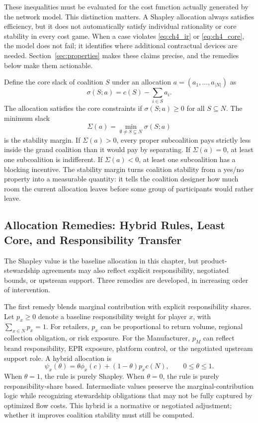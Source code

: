 These inequalities must be evaluated for the cost function actually generated by the network model. This distinction matters. A Shapley allocation always satisfies efficiency, but it does not automatically satisfy individual rationality or core stability in every cost game. When a case violates \eqref{eq:ch4_ir} or \eqref{eq:ch4_core}, the model does not fail; it identifies where additional contractual devices are needed. Section~\ref{sec:properties} makes these claims precise, and the remedies below make them actionable.

Define the core slack of coalition $S$ under an allocation $a=(a_1,\ldots,a_{|N|})$ as
\begin{equation}
\label{eq:ch4_core_slack}
\sigma(S;a)=c(S)-\sum_{i\in S}a_i.
\end{equation}
The allocation satisfies the core constraints if $\sigma(S;a)\geq 0$ for all $S\subseteq N$. The minimum slack
\begin{equation}
\label{eq:ch4_stability_margin}
\Sigma(a)=\min_{\emptyset\neq S\subsetneq N}\sigma(S;a)
\end{equation}
is the stability margin. If $\Sigma(a)>0$, every proper subcoalition pays strictly less inside the grand coalition than it would pay by separating. If $\Sigma(a)=0$, at least one subcoalition is indifferent. If $\Sigma(a)<0$, at least one subcoalition has a blocking incentive. The stability margin turns coalition stability from a yes/no property into a measurable quantity: it tells the coalition designer how much room the current allocation leaves before some group of participants would rather leave.

\subsection{Allocation Remedies: Hybrid Rules, Least Core, and Responsibility Transfer}

The Shapley value is the baseline allocation in this chapter, but product-stewardship agreements may also reflect explicit responsibility, negotiated bounds, or upstream support. Three remedies are developed, in increasing order of intervention.

The first remedy blends marginal contribution with explicit responsibility shares. Let $p_x\geq 0$ denote a baseline responsibility weight for player $x$, with $\sum_{x\in N}p_x=1$. For retailers, $p_x$ can be proportional to return volume, regional collection obligation, or risk exposure. For the Manufacturer, $p_M$ can reflect brand responsibility, EPR exposure, platform control, or the negotiated upstream support role. A hybrid allocation is
\begin{equation}
\label{eq:ch4_hybrid_allocation}
\psi_x(\theta)=\theta\phi_x(c)+(1-\theta)p_xc(N),
\qquad 0\leq \theta\leq 1.
\end{equation}
When $\theta=1$, the rule is purely Shapley. When $\theta=0$, the rule is purely responsibility-share based. Intermediate values preserve the marginal-contribution logic while recognizing stewardship obligations that may not be fully captured by optimized flow costs. This hybrid is a normative or negotiated adjustment; whether it improves coalition stability must still be computed.


